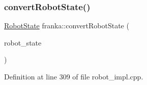 \subsubsection{\texorpdfstring{convert\+Robot\+State()}{convertRobotState()}}
{\footnotesize\ttfamily \hyperlink{structfranka_1_1RobotState}{Robot\+State} franka\+::convert\+Robot\+State (\begin{DoxyParamCaption}\item[{const \hyperlink{structresearch__interface_1_1robot_1_1RobotState}{research\+\_\+interface\+::robot\+::\+Robot\+State} \&}]{robot\+\_\+state }\end{DoxyParamCaption})\hspace{0.3cm}{\ttfamily [noexcept]}}



Definition at line 309 of file robot\+\_\+impl.\+cpp.



